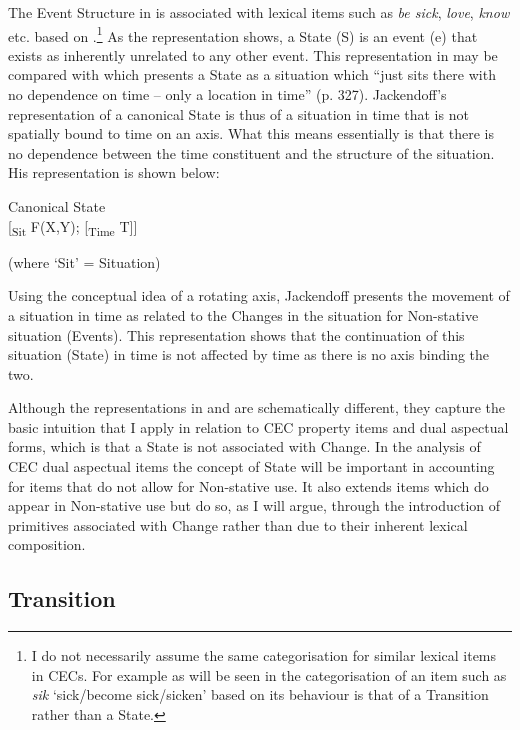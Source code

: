 The Event Structure in  is associated with lexical
items such as \textit{be sick},  \textit{love}, \textit{know} etc. based on
\citet{Pustejovsky1991}.\footnote{I do not necessarily assume the same
  categorisation for similar lexical items in CECs. For example as
  will be seen in  the categorisation of an item such
  as \textit{sik} `sick\slash become sick\slash sicken' based on its behaviour is
  that of a Transition rather than a State.}  As the representation
shows, a State (S) is an event (e) that exists as inherently unrelated
to any other event.  This representation in  may be
compared with \citet{Jackendoff1996} which presents a State as a
situation which “just sits there with no dependence on time -- only a 
location in time” (p. 327).  Jackendoff’s representation of a
canonical State is thus of a situation in time that is not spatially
bound to time on an axis.  What this means essentially is that there
is no dependence between the time constituent and the structure of the
situation.  His representation is shown below:

\ea%
\label{ex:4:6}

Canonical State \citep[327]{Jackendoff1996}\\

[\textsubscript{Sit} F(X,Y); [\textsubscript{Time} T]]

(where ‘Sit’ = Situation) 
\z

Using the conceptual idea of a rotating axis, Jackendoff presents the movement of a situation
in time as related to the Changes in the situation for Non-stative situation (Events).  This
representation shows that the continuation of this situation (State)
in time is not affected by time as there is no axis binding the two.

Although the representations in  and  are
schematically different, they capture the basic intuition that I apply
in relation to CEC property items and dual aspectual forms, which is
that a State is not associated with Change.  In the analysis of CEC
dual aspectual items the concept of State will be important in
accounting for items that do not allow for Non-stative use.  It also
extends items which do appear in Non-stative use but do so, as I will
argue, through the introduction of primitives associated with Change
rather than due to their inherent lexical composition.

 
\subsection{Transition}\label{sec:4.2.3}

